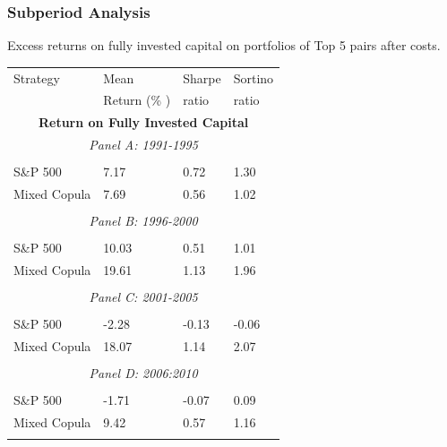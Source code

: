 \documentclass[pdf,9pt,xcolor=dvipsnames,hide notes]{beamer}
\begin{document}
\begin{frame}

\frametitle{Subperiod Analysis}

\begin{threeparttable}[H]
	\centering \tiny
	\caption{Excess returns on fully invested capital on portfolios of Top 5 pairs after costs. }
	\begin{tabularx}{\textwidth}{@{\extracolsep{\fill}}llll@{}}
		\toprule
		Strategy & Mean  & Sharpe & Sortino \\
		& Return (\% ) & ratio &  ratio     \\
		\midrule
		\multicolumn{4}{c}{\textbf{Return on Fully Invested Capital}} \\
		\multicolumn{4}{c}{\textit{Panel A: 1991-1995}} \\
		&       &       &       \\
		S\&P 500 & 7.17  & 0.72  & 1.30 \\
		Mixed Copula & 7.69  & 0.56  & 1.02 \\
		\multicolumn{1}{r}{} & \multicolumn{1}{r}{} & \multicolumn{1}{r}{} & \multicolumn{1}{r}{} \\
		\multicolumn{4}{c}{\textit{Panel B: 1996-2000}} \\
		&       &       &       \\
		S\&P 500 & 10.03  & 0.51  & 1.01 \\
		Mixed Copula & 19.61  & 1.13  & 1.96 \\
		\multicolumn{1}{r}{} & \multicolumn{1}{r}{} & \multicolumn{1}{r}{} & \multicolumn{1}{r}{} \\
		\multicolumn{4}{c}{\textit{Panel C: 2001-2005}} \\
		&       &       &       \\
		S\&P 500 & -2.28  & \cellcolor{Melon} -0.13  & -0.06 \\
		Mixed Copula & 18.07  & \cellcolor{corn} 1.14  & 2.07 \\
		\multicolumn{1}{r}{} & \multicolumn{1}{r}{} & \multicolumn{1}{r}{} & \multicolumn{1}{r}{} \\
		\multicolumn{4}{c}{\textit{Panel D: 2006:2010}} \\
		&       &       &       \\
		S\&P 500 & -1.71  & \cellcolor{Melon} -0.07  & 0.09 \\
		Mixed Copula & 9.42  & \cellcolor{corn} 0.57  & 1.16 \\
		\multicolumn{1}{r}{} & \multicolumn{1}{r}{} & \multicolumn{1}{r}{} & \multicolumn{1}{r}{} \\

\end{tabularx}
\end{threeparttable}
\end{frame}
\end{document}
